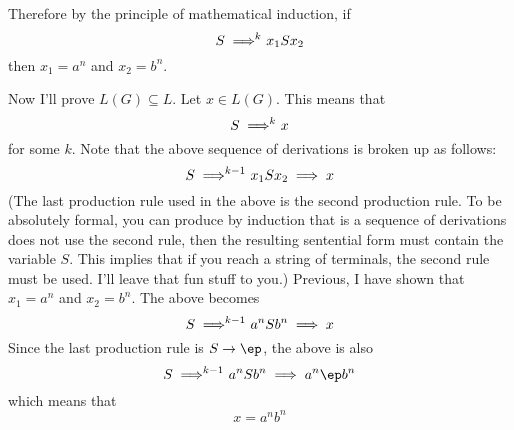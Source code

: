 Therefore by the principle of mathematical induction, 
if 
\[
S \implies^{\hspace{-0.2cm} k}\  x_1 S x_2
\]
then $x_1 = a^n$ and $x_2 = b^n$.

Now I'll prove $L(G) \subseteq L$.
Let $x \in L(G)$.
This means that 
\[
S \implies^{\hspace{-0.2cm} k}\ x
\]
for some $k$.
Note that the above sequence of derivations is broken up as follows:
\[
S \implies^{\hspace{-0.2cm} k - 1}\ x_1 S x_2 \implies x
\]
(The last production rule used in the above is the second production rule.
To be absolutely formal, you can produce by induction
that is a sequence of derivations does not use the second rule,
then the resulting sentential form must contain the variable $S$.
This implies that if you reach a string of terminals, the second rule
must be used. I'll leave that fun stuff to you.)
Previous, I have shown that $x_1 = a^n$ and $x_2 = b^n$.
The above becomes
\[
S \implies^{\hspace{-0.2cm} k - 1} \ a^n S b^n \implies x
\]
Since the last production rule is $S \rightarrow \ep$, the above is also
\[
S \implies^{\hspace{-0.2cm} k - 1} \ a^n S b^n \implies a^n \ep b^n
\]
which means that 
\[
x = a^n b^n
\]

\newpage


